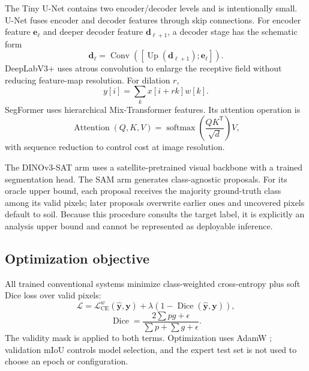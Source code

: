\documentclass[11pt]{article}
\newcommand{\miou}{\ensuremath{\mathrm{mIoU}}}
\begin{document}
The Tiny U-Net contains two encoder/decoder levels and is intentionally small. U-Net fuses encoder
and decoder features through skip connections. For encoder feature $\mathbf{e}_{\ell}$ and deeper
decoder feature $\mathbf{d}_{\ell+1}$, a decoder stage has the schematic form
\begin{equation}
\mathbf{d}_{\ell}=\operatorname{Conv}\left(
[\operatorname{Up}(\mathbf{d}_{\ell+1});\mathbf{e}_{\ell}]\right).
\end{equation}
DeepLabV3+ uses atrous convolution to enlarge the receptive field without reducing feature-map
resolution. For dilation $r$,
\begin{equation}
y[i]=\sum_k x[i+r k]w[k].
\end{equation}
SegFormer uses hierarchical Mix-Transformer features. Its attention operation is
\begin{equation}
\operatorname{Attention}(Q,K,V)=
\operatorname{softmax}\left(\frac{QK^{\mathsf T}}{\sqrt{d}}\right)V,
\end{equation}
with sequence reduction to control cost at image resolution.

The DINOv3-SAT arm uses a satellite-pretrained visual backbone with a trained segmentation head.
The SAM arm generates class-agnostic proposals. For its oracle upper bound, each proposal receives
the majority ground-truth class among its valid pixels; later proposals overwrite earlier ones and
uncovered pixels default to soil. Because this procedure consults the target label, it is explicitly
an analysis upper bound and cannot be represented as deployable inference.

\subsection{Optimization objective}

All trained conventional systems minimize class-weighted cross-entropy plus soft Dice loss over
valid pixels:
\begin{equation}
\mathcal{L}=\mathcal{L}_{\mathrm{CE}}^{w}(\hat{\mathbf y},\mathbf y)
+\lambda\left(1-\operatorname{Dice}(\hat{\mathbf y},\mathbf y)\right),
\end{equation}
\begin{equation}
\operatorname{Dice}=\frac{2\sum p g+\epsilon}{\sum p+\sum g+\epsilon}.
\end{equation}
The validity mask is applied to both terms. Optimization uses AdamW
\cite{loshchilov2019adamw}; validation \miou{} controls model selection, and the expert test set is
not used to choose an epoch or configuration.
\end{document}

